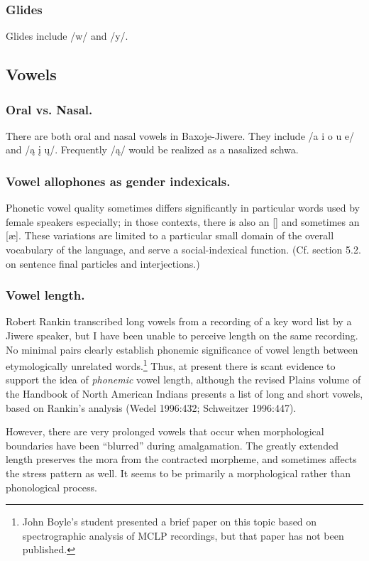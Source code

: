 \documentclass[output=paper]{LSP/langsci}
\begin{document}
\subsubsection{Glides} Glides include /w/ and /y/.  

\subsection{Vowels} 										      	         	          
\subsubsection{Oral vs. Nasal.}  There are both oral and nasal vowels in Baxoje-Jiwere.   They include /a i o u e/ and /\k{a} \k{i} \k{u}/. Frequently /\k{a}/ would be realized as a nasalized schwa. 

\subsubsection{Vowel allophones as gender indexicals.}  Phonetic vowel quality sometimes differs significantly in particular words used by female speakers especially; in those contexts, there is also an [] and sometimes an [\ae].  These variations are limited to a particular small domain of the overall vocabulary of the language, and serve a social-indexical function. (Cf. section 5.2. on sentence final particles and interjections.)   

\subsubsection{Vowel length.}  Robert Rankin transcribed long vowels from a recording of a key word list by a Jiwere speaker, but I have been unable to perceive length on the same recording. No minimal pairs clearly establish phonemic significance of vowel length between etymologically unrelated words.\footnote{John Boyle's student presented a brief paper on this topic based on spectrographic analysis of MCLP recordings, but that paper has not been published.}  Thus, at present there is scant evidence to support the idea of \textit{phonemic} vowel length, although the revised Plains volume of the Handbook of North American Indians presents a list of long and short vowels, based on Rankin's analysis (Wedel 1996:432; Schweitzer 1996:447).       	         

However, there are very prolonged vowels that occur when morphological boundaries have been ``blurred'' during amalgamation.  The greatly extended length preserves the mora from the contracted morpheme, and sometimes affects the stress pattern as well.  It seems to be primarily a morphological rather than phonological process.  
\end{document}
